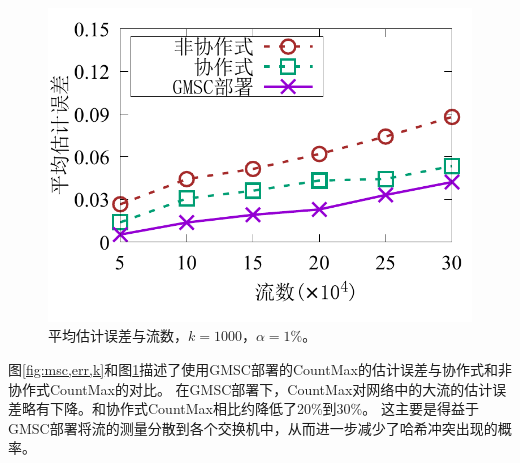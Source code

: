 \begin{figure}[ht]
\begin{minipage}[t]{0.48\linewidth}
		\includegraphics[width=\linewidth]{fig/msc_f_appr.pdf}
		\caption{\textnormal{平均估计误差与流数，$k=1000$，$\alpha = 1\%$。}}
		\label{fig:msc,err,flow}
	\end{minipage}\vspace{-0.6em}
\end{figure}

图\ref{fig:msc,err,k}和图\ref{fig:msc,err,flow}描述了使用GMSC部署的CountMax的估计误差与协作式和非协作式CountMax的对比。
在GMSC部署下，CountMax对网络中的大流的估计误差略有下降。和协作式CountMax相比约降低了20\%到30\%。
这主要是得益于GMSC部署将流的测量分散到各个交换机中，从而进一步减少了哈希冲突出现的概率。

